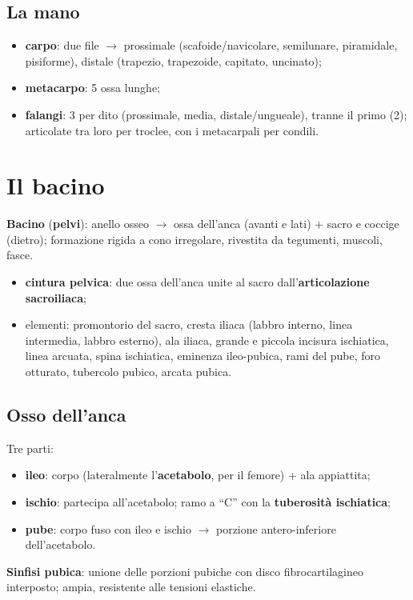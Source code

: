\subsection{La mano}
\begin{itemize}
  \item \textbf{carpo}: due file $\rightarrow$ prossimale (scafoide/navicolare, semilunare,
    piramidale, pisiforme), distale (trapezio, trapezoide, capitato, uncinato);
  \item \textbf{metacarpo}: 5 ossa lunghe;
  \item \textbf{falangi}: 3 per dito (prossimale, media, distale/ungueale), tranne il primo (2);
    articolate tra loro per troclee, con i metacarpali per condili.
\end{itemize}

\section{Il bacino}

\textbf{Bacino} (\textbf{pelvi}): anello osseo $\rightarrow$ ossa dell'anca (avanti e lati) + sacro
e coccige (dietro); formazione rigida a cono irregolare, rivestita da tegumenti, muscoli, fasce.
\begin{itemize}
  \item \textbf{cintura pelvica}: due ossa dell'anca unite al sacro dall'\textbf{articolazione
    sacroiliaca};
  \item elementi: promontorio del sacro, cresta iliaca (labbro interno, linea intermedia, labbro
    esterno), ala iliaca, grande e piccola incisura ischiatica, linea arcuata, spina ischiatica,
    eminenza ileo-pubica, rami del pube, foro otturato, tubercolo pubico, arcata pubica.
\end{itemize}

\subsection{Osso dell'anca}
Tre parti:
\begin{itemize}
  \item \textbf{ileo}: corpo (lateralmente l'\textbf{acetabolo}, per il femore) + ala appiattita;
  \item \textbf{ischio}: partecipa all'acetabolo; ramo a ``C'' con la \textbf{tuberosità
    ischiatica};
  \item \textbf{pube}: corpo fuso con ileo e ischio $\rightarrow$ porzione antero-inferiore
    dell'acetabolo.
\end{itemize}
\textbf{Sinfisi pubica}: unione delle porzioni pubiche con disco fibrocartilagineo interposto; ampia,
resistente alle tensioni elastiche.

